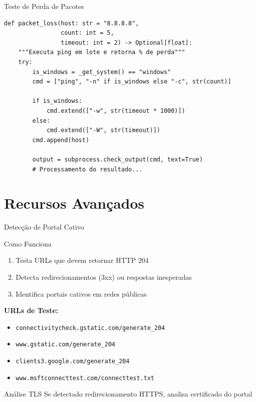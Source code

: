 \documentclass[aspectratio=169]{beamer}
\begin{document}
\begin{frame}[fragile]{Teste de Perda de Pacotes}
\begin{lstlisting}[style=pythonstyle]
def packet_loss(host: str = "8.8.8.8", 
                count: int = 5, 
                timeout: int = 2) -> Optional[float]:
    """Executa ping em lote e retorna % de perda"""
    try:
        is_windows = _get_system() == "windows"
        cmd = ["ping", "-n" if is_windows else "-c", str(count)]
        
        if is_windows:
            cmd.extend(["-w", str(timeout * 1000)])
        else:
            cmd.extend(["-W", str(timeout)])
        cmd.append(host)
        
        output = subprocess.check_output(cmd, text=True)
        # Processamento do resultado...
\end{lstlisting}
\end{frame}

\section{Recursos Avançados}

\begin{frame}{Detecção de Portal Cativo}
\begin{block}{Como Funciona}
\begin{enumerate}
    \item Testa URLs que devem retornar HTTP 204
    \item Detecta redirecionamentos (3xx) ou respostas inesperadas
    \item Identifica portais cativos em redes públicas
\end{enumerate}
\end{block}

\vspace{0.3cm}

\textbf{URLs de Teste:}
\begin{itemize}
    \item \texttt{connectivitycheck.gstatic.com/generate\_204}
    \item \texttt{www.gstatic.com/generate\_204}
    \item \texttt{clients3.google.com/generate\_204}
    \item \texttt{www.msftconnecttest.com/connecttest.txt}
\end{itemize}

\vspace{0.3cm}

\begin{alertblock}{Análise TLS}
Se detectado redirecionamento HTTPS, analisa certificado do portal
\end{alertblock}
\end{frame}
\end{document}
